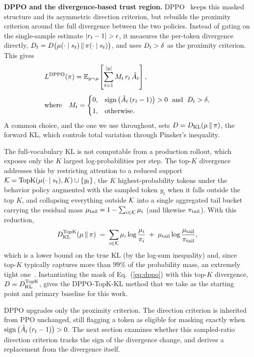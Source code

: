\noindent\textbf{DPPO and the divergence-based trust region.}
DPPO~\citep{dppo} keeps this masked structure and its asymmetric direction
criterion, but rebuilds the proximity criterion around the full divergence between
the two policies. Instead of gating on the single-sample estimate $|r_t-1|>\eps$, it
measures the per-token divergence directly,
$D_t=D\big(\mu(\cdot\mid s_t)\,\|\,\pi(\cdot\mid s_t)\big)$,
and uses $D_t>\delta$ as the proximity criterion.
This gives
\begin{equation}
\label{eq:dppo}
\begin{aligned}
&L^{\mathrm{DPPO}}(\pi)=\mathbb{E}_{y\sim\mu}\!\left[\sum_{t=1}^{|y|} M_t\,r_t\,\hat{A}_t\right],
\\[4pt]
&\text{where}\quad M_t=
\begin{cases}
0, & \operatorname{sign}\big(\hat{A}_t\,(r_t-1)\big)>0 \;\text{ and }\; D_t>\delta,\\[2pt]
1, & \text{otherwise.}
\end{cases}
\end{aligned}
\end{equation}
A common choice, and the one we use throughout, sets
$D=D_{\mathrm{KL}}(\mu\,\|\,\pi)$, the forward KL, which controls total variation
through Pinsker's inequality.

The full-vocabulary KL is not computable from a production rollout, which exposes
only the $K$ largest log-probabilities per step. The top-$K$ divergence addresses
this by restricting attention to a reduced support
$\mathcal{K}=\operatorname{TopK}(\mu(\cdot\mid s_t),K)\cup\{y_t\}$, the $K$ highest-probability
tokens under the behavior policy augmented with the sampled token $y_t$ when it falls
outside the top $K$, and collapsing everything outside
$\mathcal{K}$ into a single aggregated tail bucket carrying the residual mass
$\mu_{\mathrm{tail}}=1-\sum_{i\in\mathcal{K}}\mu_i$ (and likewise $\pi_{\mathrm{tail}}$). With this reduction,
\begin{equation}
\label{eq:topk-kl}
D_{\mathrm{KL}}^{\mathrm{TopK}}(\mu\,\|\,\pi)
\;=\; \sum_{i\in\mathcal{K}}\mu_i\log\frac{\mu_i}{\pi_i}
\;+\; \mu_{\mathrm{tail}}\log\frac{\mu_{\mathrm{tail}}}{\pi_{\mathrm{tail}}},
\end{equation}
which is a lower bound on the true KL (by the log-sum inequality) and, since
top-$K$ typically captures more than $99\%$ of the probability mass, an extremely
tight one~\citep{dppo}. Instantiating the mask of Eq.~(\ref{eq:dppo}) with this top-$K$ divergence, $D=D_{\mathrm{KL}}^{\mathrm{TopK}}$, gives the DPPO-TopK-KL method that we take as the starting point and primary baseline for this work.

DPPO upgrades only the proximity criterion.
The direction criterion is inherited from PPO unchanged, still flagging a token as
eligible for masking exactly when
$\operatorname{sign}\big(\hat{A}_t\,(r_t-1)\big)>0$.
The next section examines whether this sampled-ratio direction criterion tracks
the sign of the divergence change, and derives a replacement from the divergence
itself.
